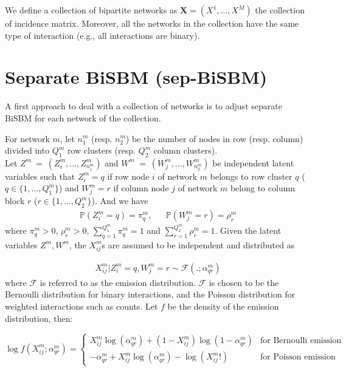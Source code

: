 \documentclass[12pt,a4paper]{report}
\begin{document}
We define a collection of bipartite networks as $\bm{X} = (X^1, \dots, X^M)$
the collection of incidence matrix. Moreover, all the networks in the collection
have the same type of interaction (e.g., all interactions are binary).

\section{Separate BiSBM (sep-BiSBM)}\label{sec:separate-bisbm-sepbisbm}

A first approach to deal with a collection of networks is to adjust separate
BiSBM for each network of the collection.

For network $m$, let $n_1^m$ (resp. $n_2^m$) be the number of nodes in row
(resp. column) divided into $Q_1^m$ row clusters (resp. $Q_2^m$ column
clusters).\\
Let $Z^m~=~(Z^m_i, \dots, Z^m_{n_1^m})$ and $W^m~=~(W^m_j, \dots, W^m_{n_2^m})$
be independent latent variables such that $Z^m_i = q$ if row node $i$ of network
$m$ belongs to row cluster $q$ ($q\in\{1,\dots,Q_1^m\}$) and $W^m_j = r$ if column node $j$ of network $m$
belong to column block $r$ ($r\in\{1,\dots,Q_2^m\}$). And we have
\begin{align}\label{eqn:lbm-block-membership-prob}
    \mathbb{P}(Z_i^m=q)=\pi_q^m,&&\mathbb{P}(W_j^m=r)=\rho_r^m
\end{align}
where $\pi_q^m > 0$, $\rho_r^m > 0$, $\sum_{q=1}^{Q_1^m}\pi_q^m = 1$ and
$\sum_{r=1}^{Q_2^m}\rho_r^m = 1$. Given the latent variables
$Z^m, W^m$, the $X_{ij}^m$s are assumed to be independent and distributed
as

\begin{align}\label{eqn:lbm-conditional-to-latent}
    X_{ij}^m|Z_i^m = q,W_j^m = r \sim \mathcal{F}(.;\alpha_{qr}^m)
\end{align}
where $\mathcal{F}$ is referred to as the emission distribution. $\mathcal{F}$ is chosen to
be the Bernoulli distribution for binary interactions, and the Poisson
distribution for weighted interactions such as counts. Let $f$ be the density of
the emission distribution, then:

\begin{equation}\label{eqn:lbm-emission}
    \log f(X^m_{ij};\alpha_{qr}^m) =
    \begin{cases}
        X_{ij}^m \log(\alpha_{qr}^m) + (1-X_{ij}^m) \log(1-\alpha_{qr}^m) & \text{for Bernoulli emission} \\
        -\alpha_{qr}^m + X_{ij}^m \log(\alpha_{qr}^m) - \log(X_{ij}^m!) & \text{for Poisson emission}
    \end{cases}
\end{equation}
\end{document}
